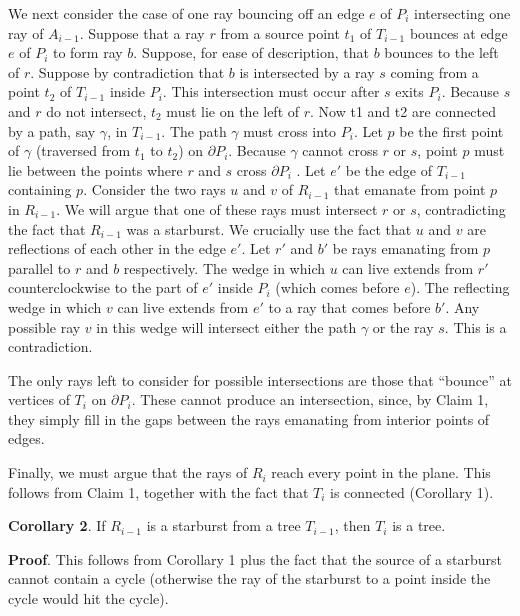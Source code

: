 \documentclass[a4paper]{article}
\begin{document}
We next consider the case of one ray bouncing off an edge \(e\) of \(P_i\) intersecting one ray of \(A_{i - 1}\). Suppose that a ray \(r\) from a source point \(t_1\) of \(T_{i - 1}\) bounces at edge \(e\) of \(P_i\) to form ray \(b\). Suppose, for ease of description, that \(b\) bounces to the left of \(r\). Suppose by contradiction that \(b\) is intersected by a ray \(s\) coming from a point \(t_2\) of \(T_{i - 1}\) inside \(P_i\). This intersection must occur after \(s\) exits \(P_i\). Because \(s\) and \(r\) do not intersect, \(t_2\) must lie on the left of \(r\). Now t1 and t2 are connected by a path, say \(\gamma\), in \(T_{i - 1}\). The path \(\gamma\) must cross into \(P_i\). Let \(p\) be the first point of \(\gamma\) (traversed from \(t_1\) to \(t_2\)) on \(\partial P_i\). Because \(\gamma\) cannot cross \(r\) or \(s\), point \(p\) must lie between the points where \(r\) and \(s\) cross  \(\partial P_i\) . Let \(e'\) be the edge of \(T_{i - 1}\) containing \(p\). Consider the two rays \(u\) and \(v\) of \(R_{i - 1}\) that emanate from point \(p\) in \(R_{i - 1}\). We will argue that one of these rays must intersect \(r\) or \(s\), contradicting the fact that \(R_{i - 1}\) was a starburst. We crucially use the fact that \(u\) and \(v\) are reflections of each other in the edge \(e'\). Let \(r'\) and \(b'\) be rays emanating from \(p\) parallel to \(r\) and \(b\) respectively. The wedge in which \(u\) can live extends from \(r'\) counterclockwise to the part of \(e'\) inside \(P_i\) (which comes before \(e\)). The reflecting wedge in which \(v\) can live extends from \(e'\) to a ray that comes before \(b'\). Any possible ray \(v\) in this wedge will intersect either the path \(\gamma\) or the ray \(s\). This is a contradiction.

The only rays left to consider for possible intersections are those that “bounce” at vertices of \(T_i\) on \(\partial P_i\). These cannot produce an intersection, since, by Claim 1, they simply fill in the gaps between the rays emanating from interior points of edges. 

Finally, we must argue that the rays of \(R_i\) reach every point in the plane. This follows from Claim 1, together with the fact that \(T_i\) is connected (Corollary 1). 

\textbf{Corollary 2}. If \(R_{i - 1}\) is a starburst from a tree \(T_{i - 1}\), then \(T_i\) is a tree.

\textbf{Proof}. This follows from Corollary 1 plus the fact that the source of a starburst cannot contain a cycle (otherwise the ray of the starburst to a point inside the cycle would hit the cycle).
\end{document}
